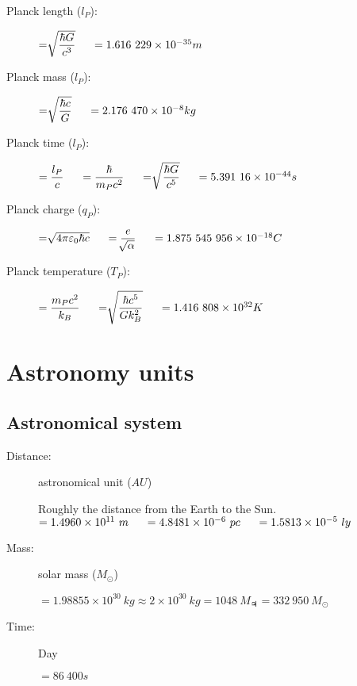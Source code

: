 \begin{description}

\item[Planck length ($l_P$):] \( =\sqrt[]{\dfrac{\hbar G}{c^3}} \tab[0.5cm] = 1.616\ 229 \times 10^{-35} m\)

\item[Planck mass ($l_P$):] \( = \sqrt[]{\dfrac{\hbar c}{G}} \tab[0.5cm] = 2.176\ 470 \times 10^{-8} kg\)

\item[Planck time ($l_P$):] \( = \dfrac{l_P}{c} \tab[0.5cm] = \dfrac{\hbar}{m_P c^2} \tab[0.5cm] = \sqrt[]{\dfrac{\hbar G}{c^5}} \tab[0.5cm] = 5.391\ 16 \times 10^{-44} s\)

\item[Planck charge ($q_P$):] \( = \sqrt[]{4\pi\varepsilon_0\hbar c} \tab[0.5cm] = \dfrac{e}{\sqrt[]{\alpha}}\tab[0.5cm] = 1.875\ 545\ 956 \times 10^{-18} C\)

\item[Planck temperature ($T_P$):] \( = \dfrac{m_P c^2}{k_B} \tab[0.5cm] = \sqrt[]{\dfrac{\hbar c^5}{Gk_B^2}} \tab[0.5cm] = 1.416\ 808 \times 10^{32} K\)

\end{description}

            
\section{Astronomy units}


\subsection{Astronomical system}
\begin{description}

\item[Distance:] astronomical unit ($AU$)
\begin{itemize}
\items Roughly the distance from the Earth to the Sun.
\items $= 1.4960 \times 10^{11}\ m \tab[0.5cm]= 4.8481 \times 10^{-6}\ pc \tab[0.5cm]= 1.5813 \times 10^{-5}\ ly$
\end{itemize}

\item[Mass:] solar mass ($M_\odot$)
\begin{itemize}
\items $= 1.98855 \times 10^{30}\ kg\approx 2 \times 10^{30}\ kg = 1048\ M_{\jupiter} = 332\ 950\ M_\odot$
\end{itemize}

\item[Time:] Day
\begin{itemize}
\items $= 86\ 400 s$
\end{itemize}
\end{description}

